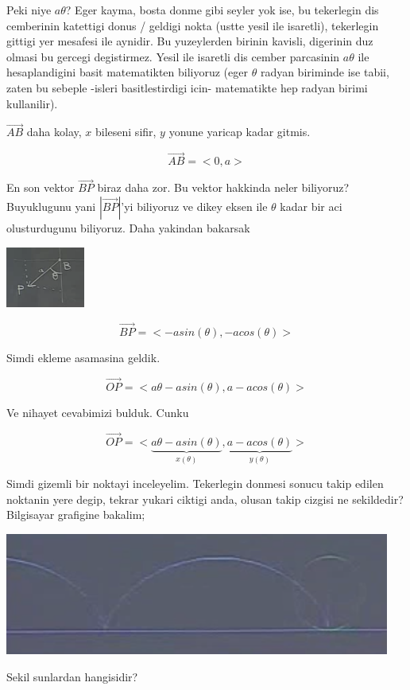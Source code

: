 \documentclass[12pt,fleqn]{article}
\begin{document}
Peki niye $a\theta$? Eger kayma, bosta donme gibi seyler yok ise, bu
tekerlegin dis cemberinin katettigi donus / geldigi nokta (ustte yesil ile
isaretli), tekerlegin gittigi yer mesafesi ile aynidir. Bu yuzeylerden
birinin kavisli, digerinin duz olmasi bu gercegi degistirmez. Yesil ile
isaretli dis cember parcasinin $a\theta$ ile hesaplandigini basit
matematikten biliyoruz (eger $\theta$ radyan biriminde ise tabii, zaten bu
sebeple -isleri basitlestirdigi icin- matematikte hep radyan birimi
kullanilir). 

$\vec{AB}$ daha kolay, $x$ bileseni sifir, $y$ yonune yaricap kadar
gitmis. 

\[ \vec{AB} = <0, a> \]

En son vektor $\vec{BP}$ biraz daha zor. Bu vektor hakkinda neler
biliyoruz? Buyuklugunu yani $|\vec{BP}|$'yi biliyoruz ve dikey eksen ile
$\theta$ kadar bir aci olusturdugunu biliyoruz. Daha yakindan bakarsak

\includegraphics[height=2cm]{5_6.png}

\[ \vec{BP} = <-asin(\theta), -acos(\theta)> \]

Simdi ekleme asamasina geldik. 

\[ \vec{OP} = <a\theta - asin(\theta), a-acos(\theta)> \]

Ve nihayet cevabimizi bulduk. Cunku 

\[ \vec{OP} = 
<
\underbrace{a\theta - asin(\theta)}_{x(\theta)}, 
\underbrace{a-acos(\theta)}_{y(\theta)}
> \]

Simdi gizemli bir noktayi inceleyelim. Tekerlegin donmesi sonucu takip
edilen noktanin yere degip, tekrar yukari ciktigi anda, olusan takip
cizgisi ne sekildedir? Bilgisayar grafigine bakalim; 

\includegraphics[height=4cm]{5_7.png}

Sekil sunlardan hangisidir? 
\end{document}
